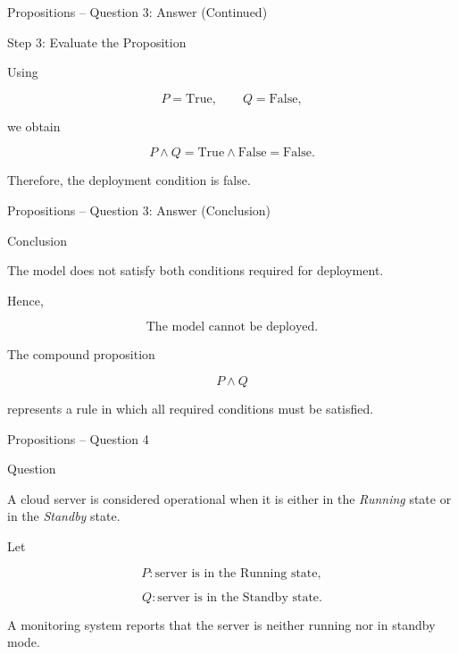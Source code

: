 \begin{frame}{Propositions -- Question 3: Answer (Continued)}

\begin{exampleblock}{Step 3: Evaluate the Proposition}

Using

$$
P=\text{True},
\qquad
Q=\text{False},
$$

we obtain

$$
P\land Q
=
\text{True}\land\text{False}
=
\text{False}.
$$

Therefore, the deployment condition is false.

\end{exampleblock}

\end{frame}


\begin{frame}{Propositions -- Question 3: Answer (Conclusion)}

\begin{exampleblock}{Conclusion}

The model does not satisfy both conditions required for deployment.

Hence,

$$
\boxed{\text{The model cannot be deployed.}}
$$

The compound proposition

$$
P\land Q
$$

represents a rule in which all required conditions must be satisfied.

\end{exampleblock}

\end{frame}


\begin{frame}{Propositions -- Question 4}

\begin{block}{Question}

A cloud server is considered operational when it is either in the
\textit{Running} state or in the \textit{Standby} state.

Let

$$
P:\text{server is in the Running state},
$$

$$
Q:\text{server is in the Standby state}.
$$

A monitoring system reports that the server is neither running nor in
standby mode.

\end{block}

\end{frame}

